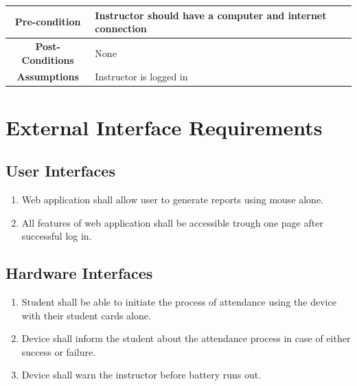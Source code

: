 \documentclass{scrreprt}
\begin{document}
\begin{table}[H]
\begin{tabular}{|c|l|}
\textbf{Pre-condition}        & Instructor should have a computer and internet connection                                                                                                                                                                                                                                                            \\ \hline
\textbf{Post-Conditions}      & None                                                                                                                                                                                                                                                                                                                 \\ \hline
\textbf{Assumptions}          & Instructor is logged in                                                                                                                                                                                                                                                                                              \\ \hline
\end{tabular}
\end{table}


{\let\clearpage\relax\chapter{External Interface Requirements}}

\section{User Interfaces}

\begin{enumerate}[leftmargin=5\parindent, label=UI-\arabic*:]
  \item Web application shall allow user to generate reports using mouse alone.
  \item All features of web application shall be accessible trough one page after successful log in.
\end{enumerate}

\section{Hardware Interfaces}
\begin{enumerate}[leftmargin=5\parindent, label=HI-\arabic*:]
   \item Student shall be able to initiate the process of attendance using the device with their student cards alone.
   \item Device shall inform the student about the attendance process in case of either success or failure.
   \item Device shall warn the instructor before battery runs out.
\end{enumerate}
\end{document}
